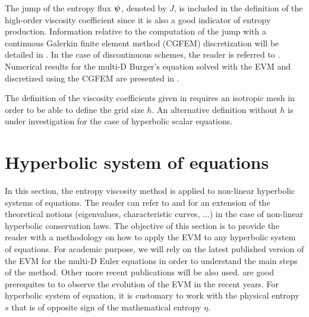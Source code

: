 %
The jump of the entropy flux $\boldsymbol\psi$, denoted by $J$, is included in the definition of the high-order viscosity coefficient since it is also a good indicator of entropy production. Information relative to the computation of the jump with a continuous Galerkin finite element method (CGFEM) discretization will be detailed in . In the case of discontinuous schemes, the reader is referred to \cite{valentin}. Numerical results for the multi-D Burger's equation solved with the EVM  and discretized using the CGFEM are presented in .
%
\begin{remark}
The definition of the viscosity coefficients given in  requires an isotropic mesh in order to be able to define the grid size $h$. An alternative definition without $h$ is under investigation for the case of hyperbolic scalar equations.
\end{remark}


\section{Hyperbolic system of equations}\label{sec:hyp_sect1b}
In this section, the entropy viscosity method is applied to non-linear hyperbolic systems of equations. The reader can refer to \cite{Toro} and \cite{Leveque} for an extension of the theoretical notions (eigenvalues, characteristic curves, $\ldots$) in the case of non-linear hyperbolic conservation laws. The objective of this section is to provide the reader with a methodology on how to apply the EVM to any hyperbolic system of equations. For academic purpose, we will rely on the latest published version of the EVM \cite{valentin} for the multi-D Euler equations in order to understand the main steps of the method. Other more recent publications will be also used. \cite{jlg, jlg2} are good prerequites to \cite{valentin} to observe the evolution of the EVM in the recent years. For hyperbolic system of equation, it is customary to work with the physical entropy $s$ that is of opposite sign of the mathematical entropy $\eta$.\\

